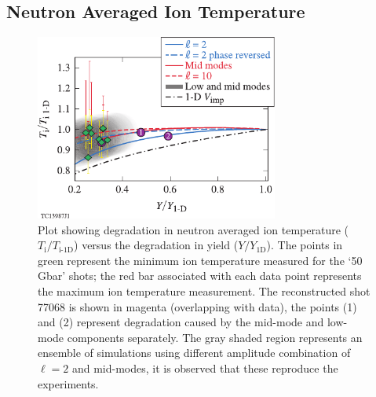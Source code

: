 \documentclass[aip,reprint]{revtex4-1}
\begin{document}
\subsection{Neutron Averaged Ion Temperature}
\label{sec:Exp_temperature}
%
%
%
\begin{figure}
\includegraphics[width=80mm]{Fig12_Bose}
\caption{\label{fig:Exp_temp} Plot showing degradation in neutron averaged ion temperature ($T_\text{i}/T_\text{i-1D}$) versus the degradation in yield ($Y/Y_\text{1D}$). The points in green represent the minimum ion temperature measured for the `50 Gbar' shots; the red bar associated with each data point represents the maximum ion temperature measurement. The reconstructed shot 77068 is shown in magenta (overlapping with data), the points (1) and (2) represent degradation caused by the mid-mode and low-mode components separately. The gray shaded region represents an ensemble of simulations using different amplitude combination of $\ell=2$ and mid-modes, it is observed that these reproduce the experiments.}
\end{figure}
%
%
%
%
%
%
\end{document}
